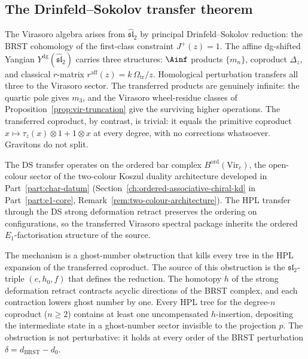 
\subsection{The Drinfeld--Sokolov transfer theorem}
\label{subsec:ds-hpl-transfer}

The Virasoro algebra arises from $\widehat{\mathfrak{sl}}_2$ by
principal Drinfeld--Sokolov reduction: the BRST cohomology of
the first-class constraint $J^+(z) = 1$. The affine dg-shifted
Yangian $Y^{\mathrm{dg}}(\widehat{\mathfrak{sl}}_2)$ carries three
structures: $\Ainf$ products $\{m_n\}$, coproduct $\Delta_z$,
and classical $r$-matrix $r^{\mathrm{aff}}(z) = k\,\Omega_{\mathrm{tr}}/z$.
Homological perturbation transfers all three to the Virasoro
sector. The transferred products are genuinely infinite: the
quartic pole gives $m_3$, and the Virasoro wheel-residue classes of
Proposition~\ref{prop:vir-truncation} give the surviving higher
operations.
The transferred coproduct, by contrast, is trivial: it equals the
primitive coproduct $x \mapsto \tau_z(x) \otimes 1 + 1 \otimes x$
at every degree, with no corrections whatsoever. Gravitons
do not split.

The DS transfer operates on the ordered bar complex $B^{\mathrm{ord}}(\mathrm{Vir}_c)$,
the open-colour sector of the two-colour Koszul duality architecture
developed in Part~\ref{part:char-datum} (Section~\ref{ch:ordered-associative-chiral-kd}
in Part~\ref{part:e1-core},
Remark~\ref{rem:two-colour-architecture}). The HPL transfer through
the DS strong deformation retract preserves the ordering on
configurations, so the transferred Virasoro spectral package inherits
the ordered \(E_1\)-factorisation structure of the source.

The mechanism is a ghost-number obstruction that kills every
tree in the HPL expansion of the transferred coproduct. The
source of this obstruction is the $\mathfrak{sl}_2$-triple
$(e, h_0, f)$ that defines the reduction. The homotopy $h$
of the strong deformation retract contracts acyclic directions
of the BRST complex, and each contraction lowers ghost number
by one. Every HPL tree for the degree-$n$ coproduct ($n \ge 2$)
contains at least one uncompensated $h$-insertion, depositing
the intermediate state in a ghost-number sector invisible to
the projection $p$. The obstruction is not perturbative:
it holds at every order of the BRST perturbation
$\delta = d_{\mathrm{BRST}} - d_0$.

